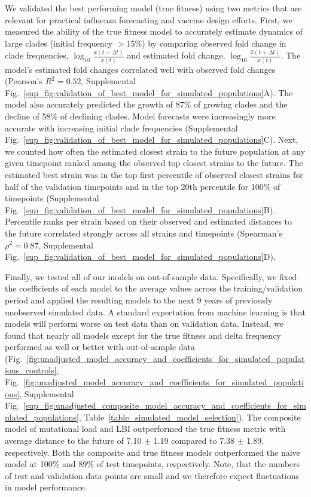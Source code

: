 We validated the best performing model (true fitness) using two metrics that are relevant for practical influenza forecasting and vaccine design efforts.
First, we measured the ability of the true fitness model to accurately estimate dynamics of large clades (initial frequency $>15\%$) by comparing observed fold change in clade frequencies, $\log_{10}{\frac{x(t + \Delta{t})}{x(t)}}$ and estimated fold change, $\log_{10}{\frac{\hat{x}(t + \Delta{t})}{x(t)}}$.
The model's estimated fold changes correlated well with observed fold changes (Pearson's $R^2 = 0.52$, Supplemental Fig.~\ref{sup_fig:validation_of_best_model_for_simulated_populations}A).
The model also accurately predicted the growth of 87\% of growing clades and the decline of 58\% of declining clades.
Model forecasts were increasingly more accurate with increasing initial clade frequencies (Supplemental Fig.~\ref{sup_fig:validation_of_best_model_for_simulated_populations}C).
Next, we counted how often the estimated closest strain to the future population at any given timepoint ranked among the observed top closest strains to the future.
The estimated best strain was in the top first percentile of observed closest strains for half of the validation timepoints and in the top 20th percentile for 100\% of timepoints (Supplemental Fig.~\ref{sup_fig:validation_of_best_model_for_simulated_populations}B).
Percentile ranks per strain based on their observed and estimated distances to the future correlated strongly across all strains and timepoints (Spearman's $\rho^2 = 0.87$, Supplemental Fig.~\ref{sup_fig:validation_of_best_model_for_simulated_populations}D).

Finally, we tested all of our models on out-of-sample data.
Specifically, we fixed the coefficients of each model to the average values across the training/validation period and applied the resulting models to the next 9 years of previously unobserved simulated data.
A standard expectation from machine learning is that models will perform worse on test data than on validation data.
Instead, we found that nearly all models except for the true fitness and delta frequency performed as well or better with out-of-sample data (Fig.~\ref{fig:unadjusted_model_accuracy_and_coefficients_for_simulated_populations_controls}, Fig.~\ref{fig:unadjusted_model_accuracy_and_coefficients_for_simulated_populations}, Supplemental Fig.~\ref{sup_fig:unadjusted_composite_model_accuracy_and_coefficients_for_simulated_populations}, Table~\ref{table_simulated_model_selection}).
The composite model of mutational load and LBI outperformed the true fitness metric with average distance to the future of 7.10 $\pm$ 1.19 compared to 7.38 $\pm$ 1.89, respectively.
Both the composite and true fitness models outperformed the naive model at 100\% and 89\% of test timepoints, respectively.
Note, that the numbers of test and validation data points are small and we therefore expect fluctuations in model performance.

